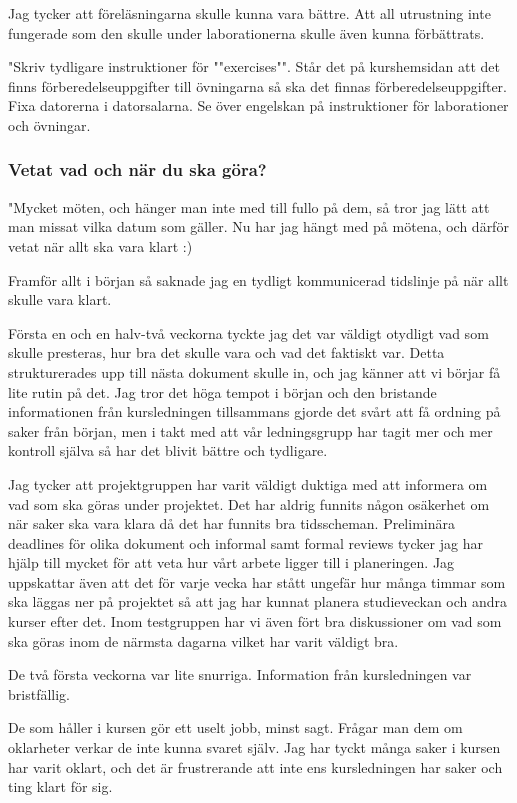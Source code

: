 \documentclass[a4paper]{article}
\begin{document}
Jag tycker att föreläsningarna skulle kunna vara bättre. Att all utrustning inte fungerade som den skulle under laborationerna skulle även kunna förbättrats.

"Skriv tydligare instruktioner för ""exercises"".
Står det på kurshemsidan att det finns förberedelseuppgifter till övningarna så ska det finnas förberedelseuppgifter.
Fixa datorerna i datorsalarna. 
Se över engelskan på instruktioner för laborationer och övningar.

\subsubsection{Vetat vad och när du ska göra?}
"Mycket möten, och hänger man inte med till fullo på dem, så tror jag lätt att man missat vilka datum som gäller. Nu har jag hängt med på mötena, och därför vetat när allt ska vara klart :)

Framför allt i början så saknade jag en tydligt kommunicerad tidslinje på när allt skulle vara klart.

Första en och en halv-två veckorna tyckte jag det var väldigt otydligt vad som skulle presteras, hur bra det skulle vara och vad det faktiskt var. Detta strukturerades upp till nästa dokument skulle in, och jag känner att vi börjar få lite rutin på det. Jag tror det höga tempot i början och den bristande informationen från kursledningen tillsammans gjorde det svårt att få ordning på saker från början, men i takt med att vår ledningsgrupp har tagit mer och mer kontroll själva så har det blivit bättre och tydligare.

Jag tycker att projektgruppen har varit väldigt duktiga med att informera om vad som ska göras under projektet. Det har aldrig funnits någon osäkerhet om när saker ska vara klara då det har funnits bra tidsscheman. Preliminära deadlines för olika dokument och informal samt formal reviews tycker jag har hjälp till mycket för att veta hur vårt arbete ligger till i planeringen. Jag uppskattar även att det för varje vecka har stått ungefär hur många timmar som ska läggas ner på projektet så att jag har kunnat planera studieveckan och andra kurser efter det. Inom testgruppen har vi även fört bra diskussioner om vad som ska göras inom de närmsta dagarna vilket har varit väldigt bra.

De två första veckorna var lite snurriga. Information från kursledningen var bristfällig. 

De som håller i kursen gör ett uselt jobb, minst sagt. Frågar man dem om oklarheter verkar de inte kunna svaret själv. Jag har tyckt många saker i kursen har varit oklart, och det är frustrerande att inte ens kursledningen har saker och ting klart för sig. 
\end{document}

